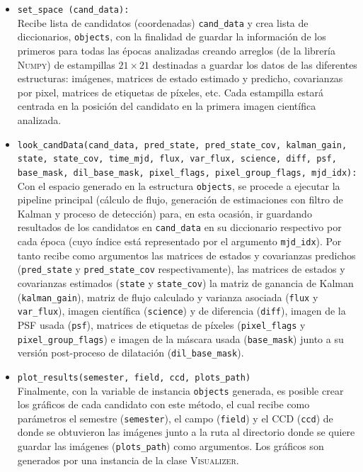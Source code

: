 \begin{itemize}
\item \texttt{set\_space (cand\_data):}\\
Recibe lista de candidatos (coordenadas) \texttt{cand\_data} y crea lista de diccionarios, \texttt{objects}, con la finalidad de guardar la informaci\'on de los primeros para todas las \'epocas analizadas creando arreglos (de la librer\'ia \textsc{Numpy}) de estampillas $21 \times 21$ destinadas a guardar los datos de las diferentes estructuras: im\'agenes, matrices de estado estimado y predicho, covarianzas por pixel, matrices de etiquetas de p\'ixeles, etc. Cada estampilla estar\'a centrada en la posici\'on del candidato en la primera imagen cient\'ifica analizada. 
\bigskip

\item \texttt{look\_candData(cand\_data, pred\_state, pred\_state\_cov, kalman\_gain, state, state\_cov, time\_mjd, flux, var\_flux, science, diff, psf, base\_mask, dil\_base\_mask, pixel\_flags, pixel\_group\_flags, mjd\_idx):}\\

Con el espacio generado en la estructura \texttt{objects}, se procede a ejecutar la pipeline principal (c\'alculo de flujo, generaci\'on de estimaciones con filtro de Kalman y proceso de detecci\'on) para, en esta ocasi\'on, ir guardando resultados de los candidatos en \texttt{cand\_data} en su diccionario respectivo por cada \'epoca (cuyo \'indice est\'a representado por el argumento \texttt{mjd\_idx}). Por tanto recibe como argumentos las matrices de estados y covarianzas predichos (\texttt{pred\_state} y \texttt{pred\_state\_cov} respectivamente), las matrices de estados y covarianzas estimados (\texttt{state} y \texttt{state\_cov}) la matriz de ganancia de Kalman (\texttt{kalman\_gain}), matriz de flujo calculado y varianza asociada (\texttt{flux} y \texttt{var\_flux}), imagen cient\'ifica (\texttt{science}) y de diferencia (\texttt{diff}), imagen de la PSF usada (\texttt{psf}), matrices de etiquetas de p\'ixeles (\texttt{pixel\_flags} y \texttt{pixel\_group\_flags}) e imagen de la m\'ascara usada (\texttt{base\_mask}) junto a su versi\'on post-proceso de dilataci\'on (\texttt{dil\_base\_mask}).


\item \texttt{plot\_results(semester, field, ccd, plots\_path)}\\
Finalmente, con la variable de instancia \texttt{objects} generada, es posible crear los gr\'aficos de cada candidato con este m\'etodo, el cual recibe como par\'ametros el semestre (\texttt{semester}), el campo (\texttt{field}) y el CCD (\texttt{ccd}) de donde se obtuvieron las im\'agenes junto a la ruta al directorio donde se quiere guardar las im\'agenes (\texttt{plots\_path}) como argumentos. Los gr\'aficos son generados por una instancia de la clase \textsc{Visualizer}.
\end{itemize}


